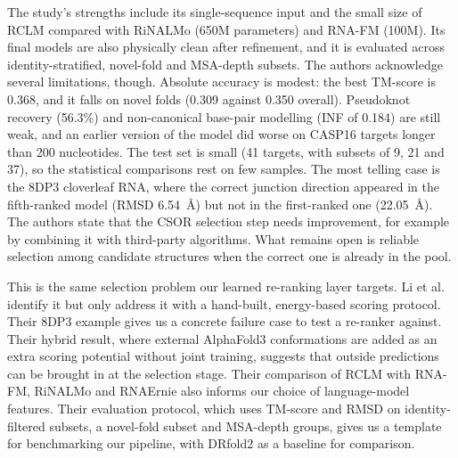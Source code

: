 \documentclass{FastFyp}
\begin{document}
The study's strengths include its single-sequence input and the small size of RCLM compared with RiNALMo (650M parameters) and RNA-FM (100M). Its final models are also physically clean after refinement, and it is evaluated across identity-stratified, novel-fold and MSA-depth subsets. The authors acknowledge several limitations, though. Absolute accuracy is modest: the best TM-score is 0.368, and it falls on novel folds (0.309 against 0.350 overall). Pseudoknot recovery (56.3\%) and non-canonical base-pair modelling (INF of 0.184) are still weak, and an earlier version of the model did worse on CASP16 targets longer than 200 nucleotides. The test set is small (41 targets, with subsets of 9, 21 and 37), so the statistical comparisons rest on few samples. The most telling case is the 8DP3 cloverleaf RNA, where the correct junction direction appeared in the fifth-ranked model (RMSD 6.54~\AA{}) but not in the first-ranked one (22.05~\AA{}). The authors state that the CSOR selection step needs improvement, for example by combining it with third-party algorithms. What remains open is reliable selection among candidate structures when the correct one is already in the pool.

This is the same selection problem our learned re-ranking layer targets. Li et al. \cite{ref:Li:2026} identify it but only address it with a hand-built, energy-based scoring protocol. Their 8DP3 example gives us a concrete failure case to test a re-ranker against. Their hybrid result, where external AlphaFold3 conformations are added as an extra scoring potential without joint training, suggests that outside predictions can be brought in at the selection stage. Their comparison of RCLM with RNA-FM, RiNALMo and RNAErnie also informs our choice of language-model features. Their evaluation protocol, which uses TM-score and RMSD on identity-filtered subsets, a novel-fold subset and MSA-depth groups, gives us a template for benchmarking our pipeline, with DRfold2 as a baseline for comparison.
\end{document}
